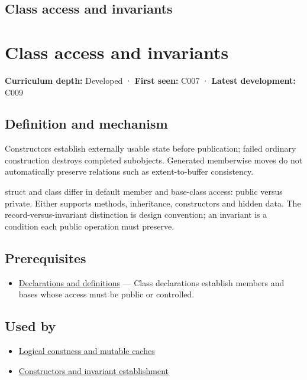 \hypertarget{appendix-8e5214819615}{}
\section*{Class access and invariants}
\chapter{Class access and invariants}\label{appendix-8e5214819615-class-access-and-invariants}

\textbf{Curriculum depth:} Developed · \textbf{First seen:} C007 · \textbf{Latest development:} C009

\section{Definition and mechanism}\label{appendix-8e5214819615-definition-and-mechanism}

Constructors establish externally usable state before publication; failed ordinary construction destroys completed subobjects. Generated memberwise moves do not automatically preserve relations such as extent-to-buffer consistency.

struct and class differ in default member and base-class access: public versus private. Either supports methods, inheritance, constructors and hidden data. The record-versus-invariant distinction is design convention; an invariant is a condition each public operation must preserve.

\section{Prerequisites}\label{appendix-8e5214819615-prerequisites}

\begin{itemize}
\tightlist
\item
  \hyperref[appendix-2e4d494c2d94]{Declarations and definitions} --- Class declarations establish members and bases whose access must be public or controlled.
\end{itemize}

\section{Used by}\label{appendix-8e5214819615-used-by}

\begin{itemize}
\tightlist
\item
  \hyperref[appendix-f5593256bcaf]{Logical constness and mutable caches}
\item
  \hyperref[appendix-7f8ec83d0886]{Constructors and invariant establishment}
\end{itemize}

